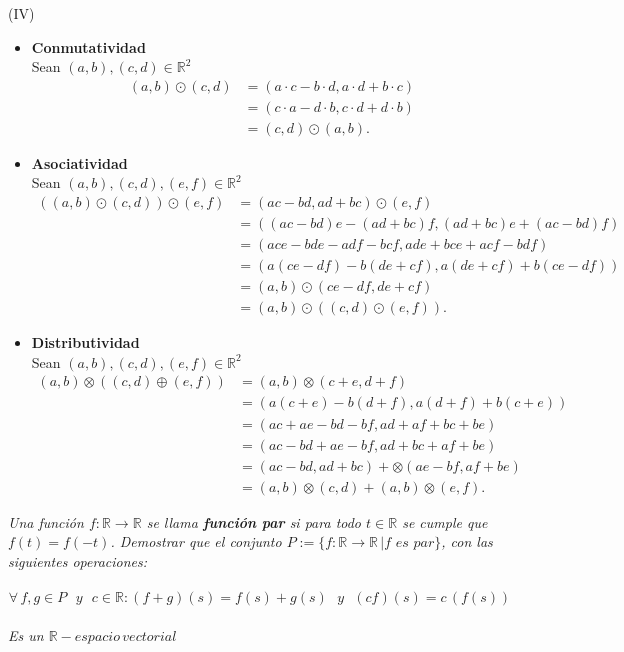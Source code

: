 \documentclass[11pt,letterpaper]{article}
\newcommand{\R}{\mathbb{R}}
\begin{document}
\begin{tcolorbox}
	(IV)\\
	\begin{itemize}
		\item \textbf{Conmutatividad}\\
		Sean $(a,b),(c,d)\in\R^2$
		\begin{align*}
			(a,b)\odot(c,d)&=(a\cdot c-b\cdot d,a\cdot d+b\cdot c)\\
			&=(c\cdot a-d\cdot b,c\cdot d+d\cdot b)\\
			&=(c,d)\odot(a,b).
		\end{align*}
		\item \textbf{Asociatividad}\\
		Sean $(a,b),(c,d),(e,f)\in\R^2$
		\begin{align*}
			((a,b)\odot(c,d))\odot(e,f)&=(ac-bd,ad+bc)\odot(e,f)\\
			&=((ac-bd)e-(ad+bc)f,(ad+bc)e+(ac-bd)f)\\
			&=(ace-bde-adf-bcf,ade+bce+acf-bdf)\\
			&=(a(ce-df)-b(de+cf),a(de+cf)+b(ce-df))\\
			&=(a,b)\odot(ce-df,de+cf)\\
			&=(a,b)\odot((c,d)\odot(e,f)).
		\end{align*}
		\item \textbf{Distributividad}\\
		Sean $(a,b),(c,d),(e,f)\in\R^2$
		\begin{align*}
			(a,b)\otimes((c,d)\oplus(e,f))&=(a,b)\otimes(c+e,d+f)\\
			&=(a(c+e)-b(d+f),a(d+f)+b(c+e))\\
			&=(ac+ae-bd-bf,ad+af+bc+be)\\
			&=(ac-bd+ae-bf,ad+bc+af+be)\\
			&=(ac-bd,ad+bc)+\otimes(ae-bf,af+be)\\
			&=(a,b)\otimes(c,d)+(a,b)\otimes(e,f).
		\end{align*}
	\end{itemize}
\end{tcolorbox}
\newpage
\begin{tcolorbox}[
	title = \textcolor{black}{\textcolor{white}{Problema 6}},]
\textit{Una funci\'on $f:\mathbb{R}\rightarrow \mathbb{R}$ se llama \textbf{funci\'on par} si para todo $t\in \mathbb{R}$ se cumple que
$f(t)=f(-t)$. Demostrar que el conjunto $P:=\{f:\mathbb{R}\rightarrow\mathbb{R}\,| f\,\,es \,\,par\}$, con las siguientes operaciones:\,\\
\,\\
\begin{equation*}
    \forall\,f,g \in P\,\,\,\,y\,\,\,\,c\in \mathbb{R}:(f+g)(s)=f(s)+g(s)\,\,\,\,y\,\,\,\,(cf)(s)=c\,(f(s))
\end{equation*}\,\\
Es un $\mathbb{R}-espacio\,vectorial$ 
}
\end{tcolorbox}\,\\
\end{document}
